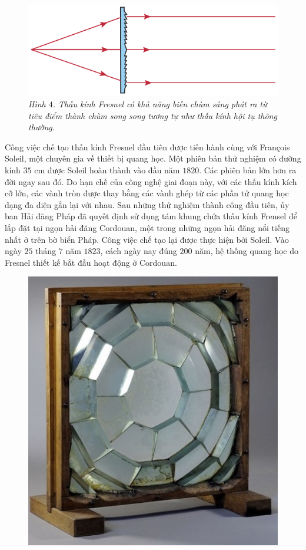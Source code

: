 \begin{multicols}{2}
	\begin{figure}[H]
		\vspace*{-5pt}
		\centering
		\captionsetup{labelformat= empty, justification=centering}
		\includegraphics[width= 1\linewidth]{5}
		\caption{\small\textit{\color{timhieukhoahoc}Hình $4$. Thấu kính Fresnel có khả năng biến chùm sáng phát ra từ tiêu điểm thành chùm song song tương tự như thấu kính hội tụ thông thường.}}
		\vspace*{-10pt}
	\end{figure}
	Công việc chế tạo thấu kính Fresnel đầu tiên được tiến hành cùng với François Soleil, một chuyên gia về thiết bị quang học. Một phiên bản thử nghiệm có đường kính $35$ cm được Soleil hoàn thành vào đầu năm $1820$. Các phiên bản lớn hơn ra đời ngay sau đó. Do hạn chế của công nghệ giai đoạn này, với các thấu kính kích cỡ lớn, các vành tròn được thay bằng các vành ghép từ các phần tử quang học dạng đa diện gắn lại với nhau. 
	\vskip 0.1cm
	Sau những thử nghiệm thành công đầu tiên, ủy ban Hải đăng Pháp đã quyết định sử dụng tám khung chứa thấu kính Frensel để lắp đặt tại ngọn hải đăng Cordouan, một trong những ngọn hải đăng nổi tiếng nhất ở trên bờ biển Pháp. Công việc chế tạo lại được thực hiện bởi Soleil. Vào ngày $25$ tháng $7$ năm $1823$, cách ngày nay đúng $200$ năm, hệ thống quang học do Fresnel thiết kế bắt đầu hoạt động ở Cordouan.
	\begin{figure}[H]
		\vspace*{5pt}
		\centering
		\captionsetup{labelformat= empty, justification=centering}
		\includegraphics[width= 0.75\linewidth]{6}

\end{figure}
\end{multicols}
